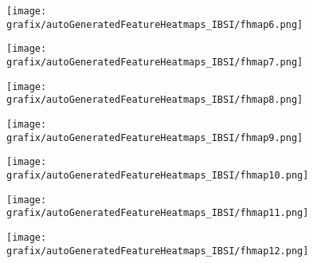 \hspace{\hsp} 
\begin{subfigure}{\wid\textwidth} 
    \centering 
    \caption{\tiny \sffamily {}} 
    \vspace{\vsp} 
    \texttt{[image: grafix/autoGeneratedFeatureHeatmaps\_IBSI/fhmap6.png]} 
\end{subfigure} 
\hspace{\hsp} 
\begin{subfigure}{\wid\textwidth} 
    \centering 
    \caption{\tiny \sffamily {}} 
    \vspace{\vsp} 
    \texttt{[image: grafix/autoGeneratedFeatureHeatmaps\_IBSI/fhmap7.png]} 
\end{subfigure} 
\hspace{\hsp} 
\begin{subfigure}{\wid\textwidth} 
    \centering 
    \caption{\tiny \sffamily {}} 
    \vspace{\vsp} 
    \texttt{[image: grafix/autoGeneratedFeatureHeatmaps\_IBSI/fhmap8.png]} 
\end{subfigure} 
\hspace{\hsp} 
\begin{subfigure}{\wid\textwidth} 
    \centering 
    \caption{\tiny \sffamily {}} 
    \vspace{\vsp} 
    \texttt{[image: grafix/autoGeneratedFeatureHeatmaps\_IBSI/fhmap9.png]} 
\end{subfigure} 
\hspace{\hsp} 
\begin{subfigure}{\wid\textwidth} 
    \centering 
    \caption{\tiny \sffamily {}} 
    \vspace{\vsp} 
    \texttt{[image: grafix/autoGeneratedFeatureHeatmaps\_IBSI/fhmap10.png]} 
\end{subfigure} 
\hspace{\hsp} 
\begin{subfigure}{\wid\textwidth} 
    \centering 
    \caption{\tiny \sffamily {}} 
    \vspace{\vsp} 
    \texttt{[image: grafix/autoGeneratedFeatureHeatmaps\_IBSI/fhmap11.png]} 
\end{subfigure} 
\hspace{\hsp} 
\begin{subfigure}{\wid\textwidth} 
    \centering 
    \caption{\tiny \sffamily {}} 
    \vspace{\vsp} 
    \texttt{[image: grafix/autoGeneratedFeatureHeatmaps\_IBSI/fhmap12.png]} 
\end{subfigure} 
